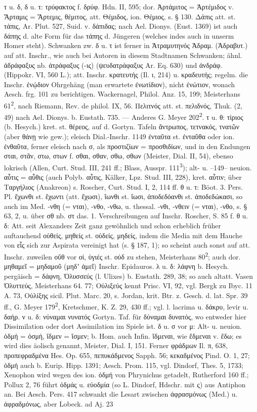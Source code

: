 τ u. δ, δ u. τ: τρύφακτος f. δρύφ. Hdn. II, 595; dor. Ἀρτάμιτος = Ἀρτέμιδος v. Ἄρταμις = Ἄρτεμις, θέμιτος, att. Θέμιδος, ion. Θέμιος, s. § 130. Δάπις att. st. τάπις, Ar. Plut. 527, Suid. v. δάπιδας; nach Ael. Dionys. (Eust. 1369) ist auch δάπης d. alte Form für das τάπης d. Jüngeren (welches indes auch in unserm Homer steht). Schwanken zw. δ u. τ ist ferner in Ἀτραμυτηνός Ἀδραμ. (Ἀδραβυτ.) auf att. Inschr., wie auch bei Autoren in diesem Stadtnamen Schwanken; ähnl. ἀδράφαξυς nb. ἀτράφαξυς (-ις) (ψευδατράφαξυς Ar. Eq. 630) und ἀνδράφ. (Hippokr. VI, 560 L.); att. Inschr. κρατευτής (Il. ι, 214) u. κραδευτής; regelm. die Inschr. ἐνῴδιον Ohrgehäng (man erwartete ἐνωτίδιον), nicht ἐνώτιον, wonach Aesch. frg. 101 zu berichtigen. Wackernagel, Philol. Anz. 15, 199; Meisterhans 61\textsuperscript{2}, nach Riemann, Rev. de philol. IX, 56. Πελιτνός att. st. πελιδνός, Thuk. (2, 49) nach Ael. Dionys. b. Eustath. 735. — Anderes G. Meyer 202\textsuperscript{2}. τ u. θ: τίριος (b. Hesych.) kret. st. θέρεος, auf d. Gortyn. Tafeln ἄντρωπος, τετνακός, τνατῶν (aber θάνῃ wie gew.); eleisch Dial.-Inschr. 1149 ἐνταῦτα st. ἐνταῦθα oder ion. ἐνθαῦτα, ferner eleisch nach σ, als προστιζίων = προσθιδίων, und in den Endungen σται, στᾶν, στω, στων f. σθαι, σθαν, σθω, σθων (Meister, Dial. II, 54), ebenso lokrisch (Allen, Curt. Stud. III, 241 ff.; Blass, Ausspr. 111\textsuperscript{3}); alt- u. --149-- neuion. αὖτις = αὖθις (auch Polyb. αὖτις, Kälker, Lpz. Stud. III, 228), kret. αὖτιν; über Ταργήλιος (Anakreon) s. Roscher, Curt. Stud. I, 2, 114 ff. θ u. τ: Böot. 3. Pers. Pl. ἔχωνθι st. ἔχωντι (att. ἔχωσι), ἴωνθι st. ἴωσι, ἀποδεδόανθι st. ἀποδεδώκασι, so auch im Med. -νθη (= νται), -νθο, -νθω, u. thessal. -νθι, -νθειν (= νται), -νθο, s. § 63, 2, u. über σθ nb. στ das. 1. Verschreibungen auf Inschr. Roscher, S. 85 f. θ u. δ: Att. seit Alexanders Zeit ganz gewöhnlich und schon erheblich früher auftauchend οὐθείς, μηθείς st. οὐδείς, μηδείς, indem die Media mit dem Hauche von εἷς sich zur Aspirata vereinigt hat (s. § 187, 1); so scheint auch sonst auf att. Inschr. zuweilen οὔθ vor οἱ, ὑγιές st. οὐδ zu stehen, Meisterhans 80\textsuperscript{2}; auch dor. μηθαμεῖ = μηδαμοῦ (μηδʼ ἁμεῖ) Inschr. Epidauros. λ u. δ: λάφνη b. Hesych. pergäisch = δάφνη, Ὀλυσσεύς (l. Ulixes) b. Eustath. 289, 38; so auch altatt. Vasen Ὀλυττεύς, Meisterhans 64. 77; Οὐλιξεύς kennt Prisc. VI, 92, vgl. Bergk zu Ibyc. 11 A. 73, Οὐλίξης sicil. Plut. Marc. 20, s. Jordan, krit. Btr. z. Gesch. d. lat. Spr. 39 ff., G. Meyer 179\textsuperscript{2}, Kretschmer, K. Z. 29, 430 ff.; vgl. l. lacrima u. δάκρυ, levir u. δαήρ. ν u. δ: νύναμαι νυνατός Gortyn. Taf. für δύναμαι δυνατός, wo entweder hier Dissimilation oder dort Assimilation im Spiele ist. δ u. σ vor μ: Alt- u. neuion. ὀδμή = ὀσμή, ἴδμεν = ἴσμεν; b. Hom. auch Infin. ἴδμεναι, wie ἔδμεναι v. ἔδω; es wird dies äolisch genannt, Meister, Dial. I, 151. Ferner φράδμων Il. π, 638, προπεφραδμένα Hes. Op. 655, πεπυκάδμενος Sapph. 56; κεκαδμένος Pind. O. 1, 27; ὀδμή auch b. Eurip. Hipp. 1391; Aesch. Prom. 115, vgl. Dindorf, Thes. 5, 1733; Xenophon wird wegen des ion. ὀδμή von Phrynichus getadelt, Rutherford 160 ff.; Pollux 2, 76 führt ὀδμάς u. εὐοδμία (so L. Dindorf, Hdschr. mit ς) aus Antiphon an. Bei Aesch. Pers. 417 schwankt die Lesart zwischen ἀφρασμόνως (Med.) u. ἀφραδμόνως, aber Lobeck. ad Aj. 23 